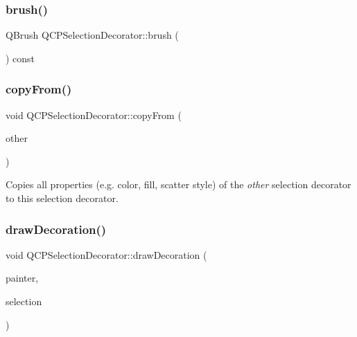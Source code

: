 \subsubsection{\texorpdfstring{brush()}{brush()}}
{\footnotesize\ttfamily Q\+Brush Q\+C\+P\+Selection\+Decorator\+::brush (\begin{DoxyParamCaption}{ }\end{DoxyParamCaption}) const\hspace{0.3cm}{\ttfamily [inline]}}

\mbox{\label{class_q_c_p_selection_decorator_a467a8d5cfcab27e862a17c797ac27b8a}} 
\subsubsection{\texorpdfstring{copyFrom()}{copyFrom()}}
{\footnotesize\ttfamily void Q\+C\+P\+Selection\+Decorator\+::copy\+From (\begin{DoxyParamCaption}\item[{const \mbox{\hyperlink{class_q_c_p_selection_decorator}{Q\+C\+P\+Selection\+Decorator}} $\ast$}]{other }\end{DoxyParamCaption})\hspace{0.3cm}{\ttfamily [virtual]}}

Copies all properties (e.\+g. color, fill, scatter style) of the {\itshape other} selection decorator to this selection decorator. \mbox{\label{class_q_c_p_selection_decorator_a4f8eb49e277063845391e803ae23054a}} 
\subsubsection{\texorpdfstring{drawDecoration()}{drawDecoration()}}
{\footnotesize\ttfamily void Q\+C\+P\+Selection\+Decorator\+::draw\+Decoration (\begin{DoxyParamCaption}\item[{\mbox{\hyperlink{class_q_c_p_painter}{Q\+C\+P\+Painter}} $\ast$}]{painter,  }\item[{\mbox{\hyperlink{class_q_c_p_data_selection}{Q\+C\+P\+Data\+Selection}}}]{selection }\end{DoxyParamCaption})\hspace{0.3cm}{\ttfamily [virtual]}}

